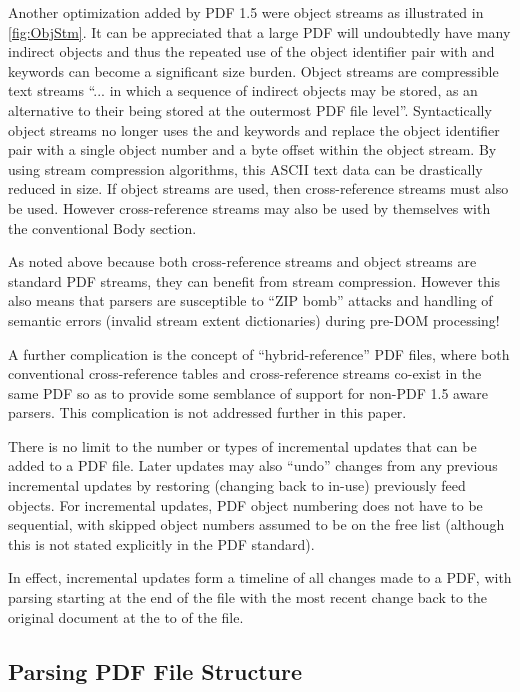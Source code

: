Another optimization added by PDF 1.5 were object streams as illustrated in \cref{fig:ObjStm}.
It can be appreciated that a large PDF will
undoubtedly have many indirect objects and thus the repeated use of the object identifier pair with 
 and  keywords can become a significant size burden. Object streams are
compressible text streams ``... in which a sequence of indirect objects may be stored, as an 
alternative to their being stored at the outermost PDF file level''. 
Syntactically object streams no longer uses the  and  keywords and replace 
the object identifier pair with a single object number and a byte offset within the object stream. 
By using stream compression algorithms, this ASCII text data can be drastically reduced in size.
If object streams are used, then cross-reference streams must also be used. However cross-reference 
streams may also be used by themselves with the conventional Body section.

As noted above because both cross-reference streams and object streams are standard PDF streams, they 
can benefit from stream compression. However this also means that parsers are   
susceptible to ``ZIP bomb'' attacks and handling of semantic errors (invalid stream extent dictionaries) 
during pre-DOM processing!

A further complication is the concept of ``hybrid-reference'' PDF files, where both conventional cross-reference tables and cross-reference streams co-exist in the same PDF so as to provide some semblance of support for non-PDF 1.5 aware parsers. This complication is not addressed further in this paper.

There is no limit to the number or types of incremental updates that can be added to a PDF file. Later
updates may also ``undo'' changes from any previous incremental updates by restoring (changing back to in-use)
previously feed objects. For incremental updates, PDF object numbering 
does not have to be sequential, with skipped object numbers assumed to be on
the free list (although this is not stated explicitly in the PDF standard).

In effect, incremental updates form a timeline of all changes made to a PDF, with parsing starting
at the end of the file with the most recent change back to the original document at the to of the file.

\subsection{Parsing PDF File Structure}
\label{sec:parsingfile}

